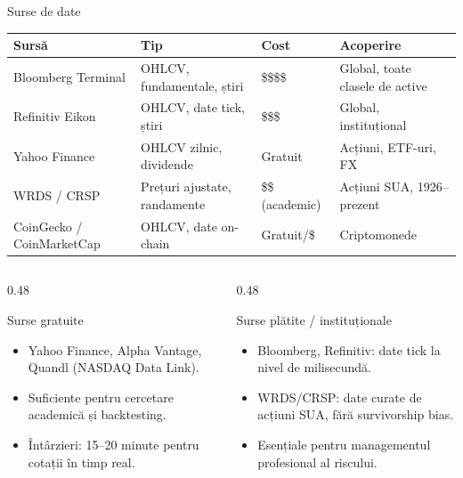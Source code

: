 \documentclass[9pt, aspectratio=169, t]{beamer}
\theoremstyle{definition}
\begin{document}
\begin{frame}{Surse de date}
\begin{center}
{\scriptsize
\renewcommand{\arraystretch}{1.3}
\begin{tabular}{llll}
\toprule
\textbf{Sursă} & \textbf{Tip} & \textbf{Cost} & \textbf{Acoperire} \\
\midrule
Bloomberg Terminal & OHLCV, fundamentale, știri & \$\$\$\$ & Global, toate clasele de active \\
Refinitiv Eikon & OHLCV, date tick, știri & \$\$\$ & Global, instituțional \\
Yahoo Finance & OHLCV zilnic, dividende & Gratuit & Acțiuni, ETF-uri, FX \\
WRDS / CRSP & Prețuri ajustate, randamente & \$\$ (academic) & Acțiuni SUA, 1926--prezent \\
CoinGecko / CoinMarketCap & OHLCV, date on-chain & Gratuit/\$ & Criptomonede \\
\bottomrule
\end{tabular}
}
\end{center}
\vspace{0.15cm}
\begin{columns}[T]
\begin{column}{0.48\textwidth}
\begin{block}{Surse gratuite}
\begin{itemize}
    \item Yahoo Finance, Alpha Vantage, Quandl (NASDAQ Data Link).
    \item Suficiente pentru cercetare academică și backtesting.
    \item Întârzieri: 15--20 minute pentru cotații în timp real.
\end{itemize}
\end{block}
\end{column}
\begin{column}{0.48\textwidth}
\begin{block}{Surse plătite / instituționale}
\begin{itemize}
    \item Bloomberg, Refinitiv: date tick la nivel de milisecundă.
    \item WRDS/CRSP: date curate de acțiuni SUA, fără survivorship bias.
    \item Esențiale pentru managementul profesional al riscului.
\end{itemize}
\end{block}
\end{column}
\end{columns}
\end{frame}
\end{document}
